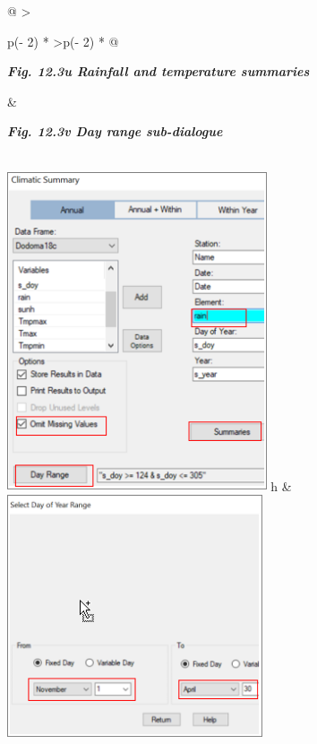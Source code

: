 \documentclass[
  letterpaper,
  DIV=11,
  numbers=noendperiod]{scrreprt}
\begin{document}
\begin{longtable}[]{@{}
  >{\raggedright\arraybackslash}p{(\columnwidth - 2\tabcolsep) * }
  >{\raggedleft\arraybackslash}p{(\columnwidth - 2\tabcolsep) * }@{}}
\toprule\noalign{}
\begin{minipage}[b]{\linewidth}\raggedright
\textbf{\emph{Fig. 12.3u Rainfall and temperature summaries}}
\end{minipage} & \begin{minipage}[b]{\linewidth}\raggedleft
\textbf{\emph{Fig. 12.3v Day range sub-dialogue}}
\end{minipage} \\
\midrule\noalign{}
\endhead
\bottomrule\noalign{}
\endlastfoot
\includegraphics[width=3.01735in,height=3.71971in]{figures/Fig12.3u.png}
h &
\includegraphics[width=2.9682in,height=\textheight]{figures/Fig12.3v.png} \\
\end{longtable}
\end{document}
